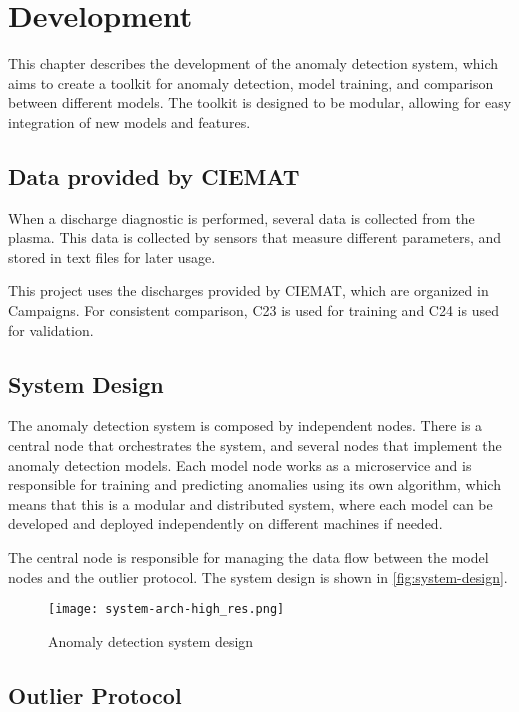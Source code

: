 \chapter{Development}\label{sec:cap3}

This chapter describes the development of the anomaly detection system, which aims to create a toolkit for anomaly detection, model training, and comparison between different models. The toolkit is designed to be modular, allowing for easy integration of new models and features.

\section{Data provided by \acs{CIEMAT}}

When a discharge diagnostic is performed, several data is collected from the plasma. This data is collected by sensors that measure different parameters, and stored in text files for later usage.


This project uses the discharges provided by \ac{CIEMAT}, which are organized in Campaigns. For consistent comparison, C23 is used for training and C24 is used for validation.


\section{System Design}

The anomaly detection system is composed by independent nodes. There is a central node that orchestrates the system, and several nodes that implement the anomaly detection models. Each model node works as a microservice and is responsible for training and predicting anomalies using its own algorithm, which means that this is a modular and distributed system, where each model can be developed and deployed independently on different machines if needed.

The central node is responsible for managing the data flow between the model nodes and the outlier protocol. The system design is shown in \autoref{fig:system-design}.

\begin{figure}[H]
    \centering
    \texttt{[image: system-arch-high\_res.png]}
    \caption{Anomaly detection system design}
    \label{fig:system-design}
\end{figure}

\section{Outlier Protocol}

